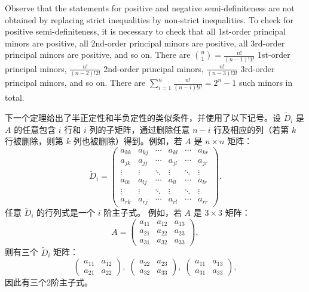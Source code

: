 \begin{original}
Observe that the statements for positive and negative semi-definiteness are not obtained by replacing strict inequalities by non-strict inequalities. To check for positive semi-definiteness, it is necessary to check that all 1st-order principal minors are positive, all 2nd-order principal minors are positive, all 3rd-order principal minors are positive, and so on.
There are $\binom{n}{1} = \frac{n!}{(n-1)!1!}$ 1st-order principal minors, $\frac{n!}{(n-2)!2!}$ 2nd-order principal minors, $\frac{n!}{(n-3)!3!}$ 3rd-order principal minors, and so on. There are $\sum_{i=1}^n \frac{n!}{(n-i)!i!} = 2^n - 1$ such minors in total.
\end{original}
\begin{translation}
下一个定理给出了半正定性和半负定性的类似条件，并使用了以下记号。设 $\tilde{D}_i$ 是 $A$ 的任意包含 $i$ 行和 $i$ 列的子矩阵，通过删除任意 $n-i$ 行及相应的列（若第 $k$ 行被删除，则第 $k$ 列也被删除）得到。例如，若 $A$ 是 $n \times n$ 矩阵：
\[
\tilde{D}_i =
\begin{pmatrix}
a_{kk} & a_{kj} & \cdots & a_{kl} & \cdots & a_{kr} \\
a_{jk} & a_{jj} & \cdots & a_{jl} & \cdots & a_{jr} \\
\vdots & \vdots & \ddots & \vdots & \ddots & \vdots \\
a_{lk} & a_{lj} & \cdots & a_{ll} & \cdots & a_{lr} \\
\vdots & \vdots & \ddots & \vdots & \ddots & \vdots \\
a_{rk} & a_{rj} & \cdots & a_{rl} & \cdots & a_{rr}
\end{pmatrix}.
\]
任意 $\tilde{D}_i$ 的行列式是一个 $i$ 阶主子式。
例如，若 $A$ 是 $3 \times 3$ 矩阵：
\[
A = \begin{pmatrix} a_{11} & a_{12} & a_{13} \\ a_{21} & a_{22} & a_{23} \\ a_{31} & a_{32} & a_{33} \end{pmatrix},
\]
则有三个 $\tilde{D}_i$ 矩阵：
\[
\begin{pmatrix} a_{11} & a_{12} \\ a_{21} & a_{22} \end{pmatrix},\;
\begin{pmatrix} a_{22} & a_{23} \\ a_{32} & a_{33} \end{pmatrix},\;
\begin{pmatrix} a_{11} & a_{13} \\ a_{31} & a_{33} \end{pmatrix},
\]
因此有三个2阶主子式。


\end{translation}
